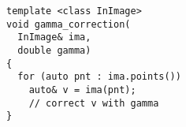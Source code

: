 \documentclass[varwidth=4.5cm,border={0.1cm 0.1cm 0.1cm 0.1cm}]{standalone}
\begin{document}
\begin{verbatim}
template <class InImage>
void gamma_correction(
  InImage& ima,
  double gamma)
{
  for (auto pnt : ima.points())
    auto& v = ima(pnt);
    // correct v with gamma
}
\end{verbatim}
\end{document}
